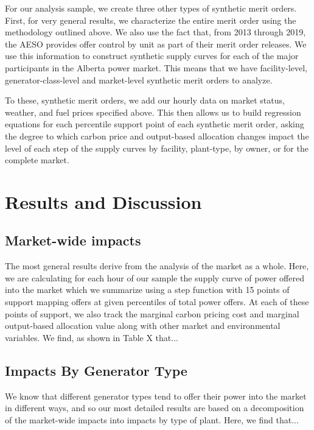 \documentclass[12pt]{article}
\begin{document}
For our analysis sample, we create three other types of synthetic merit orders. First, for very general results, we characterize the entire merit order using the methodology outlined above. We also use the fact that, from 2013 through 2019, the AESO provides offer control by unit as part of their merit order releases. We use this information to construct synthetic supply curves for each of the major participants in the Alberta power market. This means that we have facility-level, generator-class-level and market-level synthetic merit orders to analyze.

To these, synthetic merit orders, we add our hourly data on market status, weather, and fuel prices specified above. This then allows us to build regression equations for each percentile support point of each synthetic merit order, asking the degree to which carbon price and output-based allocation changes impact the level of each step of the supply curves by facility, plant-type, by owner, or for the complete market.

\section{Results and Discussion}


\subsection{Market-wide impacts}
The most general results derive from the analysis of the market as a whole. Here, we are calculating for each hour of our sample the supply curve of power offered into the market which we summarize using a step function with 15 points of support mapping offers at given percentiles of total power offers. At each of these points of support, we also track the marginal carbon pricing cost and marginal output-based allocation value along with other market and environmental variables. We find, as shown in Table X that...


\subsection{Impacts By Generator Type}
We know that different generator types tend to offer their power into the market in different ways, and so our most detailed results are based on a decomposition of the market-wide impacts into impacts by type of plant. Here, we find that...
\end{document}
